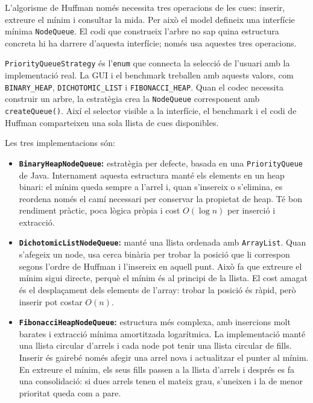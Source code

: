 \documentclass[conference,compsoc]{IEEEtran}
\begin{document}
L'algorisme de Huffman només necessita tres operacions de les cues: inserir,
extreure el mínim i consultar la mida. Per això el model defineix una
interfície mínima \texttt{NodeQueue}. El codi que construeix l'arbre no
sap quina estructura concreta hi ha darrere d'aquesta interfície; només
usa aquestes tres operacions.

\texttt{PriorityQueueStrategy} és l'\texttt{enum} que connecta la selecció
de l'usuari amb la implementació real. La GUI i el benchmark treballen amb
aquests valors, com \texttt{BINARY\_HEAP}, \texttt{DICHOTOMIC\_LIST} i
\texttt{FIBONACCI\_HEAP}. Quan el codec necessita construir un arbre, la
estratègia crea la \texttt{NodeQueue} corresponent amb \texttt{createQueue()}.
Així el selector visible a la interfície, el benchmark i el codi de
Huffman comparteixen una sola llista de cues disponibles.

Les tres implementacions són:

\begin{itemize}
    \item \textbf{\texttt{BinaryHeapNodeQueue}:} estratègia per defecte,
          basada en una \texttt{PriorityQueue} de Java. Internament aquesta
          estructura manté els elements en un heap binari: el mínim queda
          sempre a l'arrel i, quan s'insereix o s'elimina, es reordena
          només el camí necessari per conservar la propietat de heap. Té
          bon rendiment pràctic, poca lògica pròpia i cost $O(\log n)$ per
          inserció i extracció.
    \item \textbf{\texttt{DichotomicListNodeQueue}:} manté una llista
          ordenada amb \texttt{ArrayList}. Quan s'afegeix un node, usa
          cerca binària per trobar la posició que li correspon segons
          l'ordre de Huffman i l'insereix en aquell punt. Això fa que
          extreure el mínim sigui directe, perquè el mínim és al principi
          de la llista. El cost amagat és el desplaçament dels elements de
          l'array: trobar la posició és ràpid, però inserir pot costar
          $O(n)$.
    \item \textbf{\texttt{FibonacciHeapNodeQueue}:} estructura més
          complexa, amb insercions molt barates i extracció mínima
          amortitzada logarítmica. La implementació
          manté una llista circular d'arrels i cada node pot tenir una
          llista circular de fills. Inserir és gairebé només afegir una
          arrel nova i actualitzar el punter al mínim. En extreure el
          mínim, els seus fills passen a la llista d'arrels i després es
          fa una consolidació: si dues arrels tenen el mateix grau,
          s'uneixen i la de menor prioritat queda com a pare.
\end{itemize}
\end{document}

